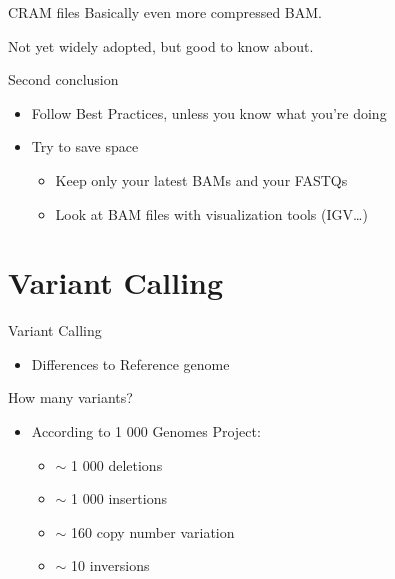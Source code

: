 \documentclass[usepdftitle=false]{beamer}
\begin{document}
\begin{frame}{CRAM files}
	Basically even more compressed BAM.
	\pause

	Not yet widely adopted, but good to know about.
\end{frame}

\begin{frame}{Second conclusion}
	\begin{itemize}
		\item Follow Best Practices, unless you know what you're doing
		\pause
		\item Try to save space
		\begin{itemize}
			\item Keep only your latest BAMs and your FASTQs
			\item Look at BAM files with visualization tools (IGV\dots)
		\end{itemize}
	\end{itemize}
\end{frame}

\section{Variant Calling}

\begin{frame}{Variant Calling}
	\begin{itemize}
		\item Differences to Reference genome
	\end{itemize}
\end{frame}

\begin{frame}{How many variants?}
	\begin{itemize}
		\item According to 1 000 Genomes Project:
		\pause
		\begin{itemize}
			\item $\sim$ 1 000 deletions
			\pause
			\item $\sim$ 1 000 insertions
			\pause
			\item $\sim$ 160 copy number variation
			\pause
			\item $\sim$ 10 inversions
		\end{itemize}
	\end{itemize}
\end{frame}
\end{document}
